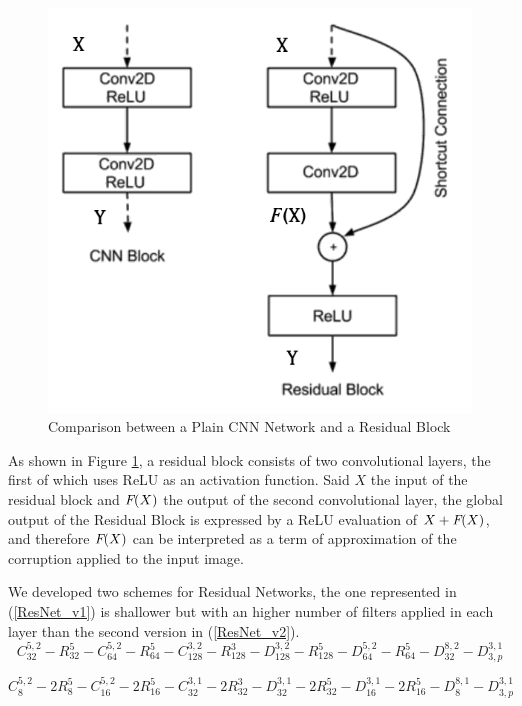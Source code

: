 \documentclass[12pt,a4paper]{report}
\begin{document}
\begin{figure}[hbtp]
\centering
\includegraphics[scale=0.5]{ResidualBlock.png}
\caption{Comparison between a Plain CNN Network and a Residual Block}\label{ResNet}
\end{figure}

As shown in Figure \ref{ResNet}, a residual block consists of two convolutional layers, the first of which uses ReLU as an activation function. Said $X$ the input of the residual block and $\emph{F}(X)$ the output of the second convolutional layer, the global output of the Residual Block is expressed by a ReLU evaluation of $X +\emph{F}(X) $, and therefore $\emph{F}(X)$ can be interpreted as a term of approximation of the corruption applied to the input image.

We developed two schemes for Residual Networks, the one represented in (\ref{ResNet_v1}) is shallower but with an higher number of filters applied in each layer than the second version in (\ref{ResNet_v2}).
\begin{equation}
C_{32}^{5,2} - R_{32}^5 - C_{64}^{5,2} - R_{64}^5 - C_{128}^{3,2} - R_{128}^3 - D_{128}^{3,2} - R_{128}^5 - D_{64}^{5,2} - R_{64}^5 - D_{32}^{8,2} - D_{3,p}^{3,1} 
\label{ResNet_v1}
\end{equation}

\begin{equation}
C_{8}^{5,2} - 2R_{8}^5 - C_{16}^{5,2} - 2R_{16}^5 - C_{32}^{3,1} - 2R_{32}^3 - D_{32}^{3,1} - 2R_{32}^5 - D_{16}^{3,1} - 2R_{16}^5 - D_{8}^{8,1} - D_{3,p}^{3,1} 
\label{ResNet_v2}
\end{equation}
\end{document}
